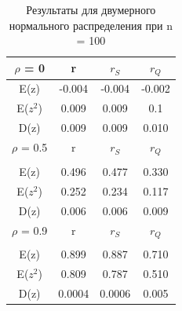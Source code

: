 \documentclass[a4]{article}
\begin{document}
		\begin{table}[h!]
			
			\caption{Результаты для двумерного нормального распределения при  n = 100}
			\label{tab:my_label}
			\begin{center}
				\vspace{5mm}
				\begin{tabular}{|c|c|c|c}
					\hline
					$\rho$ = 0 & r & $r_S$ & $r_Q$ \\
					\hline
					E(z) & -0.004 & -0.004 & -0.002\\
					\hline
					E($z^2$)   & 0.009 & 0.009 & 0.1\\
					\hline
					D(z)   & 0.009 & 0.009 & 0.010 \\
					\hline
					$\rho$ = 0.5 & r & $r_S$ & $r_Q$ \\
					\hline\\
					\hline
					E(z) & 0.496 & 0.477 & 0.330\\
					\hline
					E($z^2$)   & 0.252 & 0.234 & 0.117\\
					\hline
					D(z)   & 0.006 & 0.006 & 0.009 \\
					\hline
					$\rho$ = 0.9 & r & $r_S$ & $r_Q$ \\
					\hline\\
					\hline
					E(z) & 0.899 & 0.887 & 0.710\\
					\hline
					E($z^2$)   & 0.809 & 0.787 & 0.510\\
					\hline
					D(z)   & 0.0004 & 0.0006 & 0.005 \\
					\hline
				\end{tabular}
				
			\end{center}
			
		\end{table}
		
\end{document}
